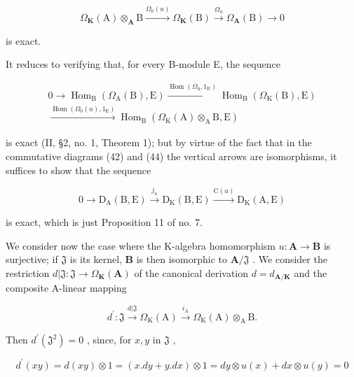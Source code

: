 \[
\Omega_ {\mathbf {K}} (\mathrm{A}) \otimes_ {\mathbf {A}} \mathrm{B} \xrightarrow {\Omega_ {0} (u)} \Omega_ {\mathbf {K}} (\mathrm{B}) \xrightarrow {\Omega_ {u}} \Omega_ {\mathbf {A}} (\mathrm{B}) \to 0\tag{45}
\]

is exact.

It reduces to verifying that, for every B-module E, the sequence

\[
\begin{array}{c} 0 \to \operatorname{Hom} _ {\mathrm{B}} (\Omega_ {\mathrm{A}} (\mathrm{B}), \mathrm{E}) \xrightarrow {\operatorname{Hom} (\Omega_ {\mathrm{u}} , 1 _ {\mathrm{E}})} \operatorname{Hom} _ {\mathrm{B}} (\Omega_ {\mathrm{K}} (\mathrm{B}), \mathrm{E}) \\ \xrightarrow {\operatorname{Hom} (\Omega_ {0} (u) , 1 _ {\mathrm{E}})} \operatorname{Hom} _ {\mathrm{B}} (\Omega_ {\mathrm{K}} (\mathrm{A}) \otimes_ {\mathrm{A}} \mathrm{B}, \mathrm{E}) \end{array}
\]

is exact (II, §2, no. 1, Theorem 1); but by virtue of the fact that in the commutative diagrams (42) and (44) the vertical arrows are isomorphisms, it suffices to show that the sequence

\[
0 \longrightarrow \mathrm{D} _ {\mathrm{A}} (\mathrm{B}, \mathrm{E}) \xrightarrow {j _ {u}} \mathrm{D} _ {\mathrm{K}} (\mathrm{B}, \mathrm{E}) \xrightarrow {\mathrm{C} (u)} \mathrm{D} _ {\mathrm{K}} (\mathrm{A}, \mathrm{E})
\]

is exact, which is just Proposition 11 of no. 7.

We consider now the case where the K-algebra homomorphism \(u: \mathbf{A} \to \mathbf{B}\) is surjective; if \(\mathfrak{J}\) is its kernel, \(\mathbf{B}\) is then isomorphic to \(\mathbf{A} / \mathfrak{J}\) . We consider the restriction \(d| \mathfrak{J}: \mathfrak{J} \to \Omega_{\mathbf{K}}(\mathbf{A})\) of the canonical derivation \(d = d_{\mathbf{A} / \mathbf{K}}\) and the composite A-linear mapping

\[
d ^ {\prime}: \mathfrak {J} \xrightarrow {d | \mathfrak {J}} \Omega_ {\mathrm{K}} (\mathrm{A}) \xrightarrow {i _ {\mathrm{A}}} \Omega_ {\mathrm{K}} (\mathrm{A}) \otimes_ {\mathrm{A}} \mathrm{B}.
\]

Then \(d^{\prime}(\mathfrak{J}^{2}) = 0\) , since, for \(x, y\) in \(\mathfrak{J}\) ,

\[
d ^ {\prime} (x y) = d (x y) \otimes 1 = (x. d y + y. d x) \otimes 1 = d y \otimes u (x) + d x \otimes u (y) = 0
\]

